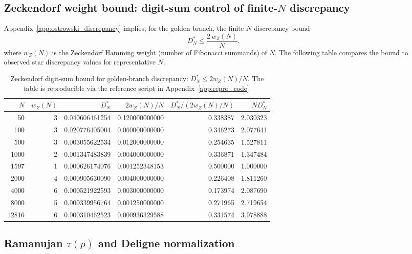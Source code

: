 \subsection{Zeckendorf weight bound: digit-sum control of finite-$N$ discrepancy}
\label{app:quant_fits_zeckendorf_weight}

Appendix~\ref{app:ostrowski_discrepancy} implies, for the golden branch, the finite-$N$ discrepancy bound
\begin{equation}
D_N^*\le \frac{2\,w_Z(N)}{N},
\end{equation}
where $w_Z(N)$ is the Zeckendorf Hamming weight (number of Fibonacci summands) of $N$. The following table compares the bound to observed star discrepancy values for representative $N$.

\begin{table}[H]
\centering
\begin{tabular}{rrrrrr}
\toprule
$N$ & $w_Z(N)$ & $D_N^*$ & $2w_Z(N)/N$ & $D_N^*/(2w_Z(N)/N)$ & $N D_N^*$ \\
\midrule
50    & 3 & 0.040606461254 & 0.120000000000 & 0.338387 & 2.030323 \\
100   & 3 & 0.020776405004 & 0.060000000000 & 0.346273 & 2.077641 \\
500   & 3 & 0.003055622534 & 0.012000000000 & 0.254635 & 1.527811 \\
1000  & 2 & 0.001347483839 & 0.004000000000 & 0.336871 & 1.347484 \\
1597  & 1 & 0.000626174076 & 0.001252348153 & 0.500000 & 1.000000 \\
2000  & 4 & 0.000905630090 & 0.004000000000 & 0.226408 & 1.811260 \\
4000  & 6 & 0.000521922593 & 0.003000000000 & 0.173974 & 2.087690 \\
8000  & 5 & 0.000339956764 & 0.001250000000 & 0.271965 & 2.719654 \\
12816 & 6 & 0.000310462523 & 0.000936329588 & 0.331574 & 3.978888 \\
\bottomrule
\end{tabular}
\caption{Zeckendorf digit-sum bound for golden-branch discrepancy: $D_N^*\le 2w_Z(N)/N$. The table is reproducible via the reference script in Appendix~\ref{app:repro_code}.}
\label{tab:zeckendorf_weight_discrepancy}
\end{table}

\subsection{Ramanujan \texorpdfstring{$\tau(p)$}{tau(p)} and Deligne normalization}
\label{app:quant_fits_tau}

